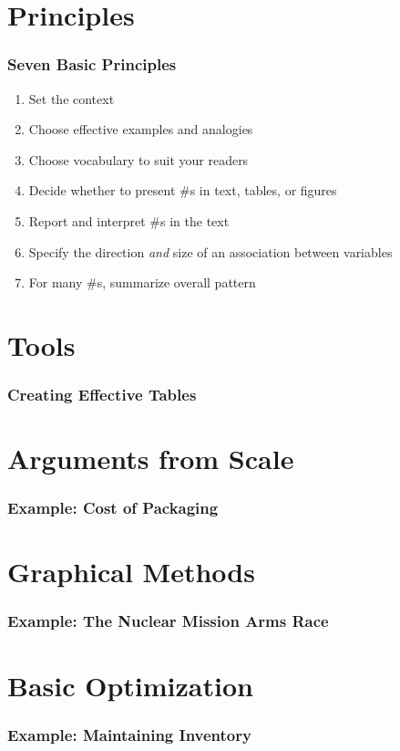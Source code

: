 \documentclass[compress,handout,10pt]{beamer}
\let\olditem\item
\renewcommand{\item}{\setlength{\itemsep}{0.5\baselineskip}\olditem}
\begin{document}
\section{Principles}
\begin{frame}
    \frametitle{Seven Basic Principles}
     \begin{enumerate}
         \item Set the context 
         \item Choose effective examples and analogies
         \item Choose vocabulary to suit your readers
         \item Decide whether to present \#s in text, tables, or figures
         \item Report and interpret \#s in the text
         \item Specify the direction \emph{and} size of an association between variables
         \item For many \#s, summarize overall pattern 
     \end{enumerate}
\end{frame}

\section{Tools}
\begin{frame}
    \frametitle{Creating Effective Tables}
\end{frame}

\section{Arguments from Scale}

\begin{frame}
    \frametitle{Example: Cost of Packaging}
\end{frame}

\section{Graphical Methods}
\begin{frame}
    \frametitle{Example: The Nuclear Mission Arms Race}
\end{frame}

\section{Basic Optimization}
\begin{frame}
    \frametitle{Example: Maintaining Inventory}
\end{frame}
\end{document}

